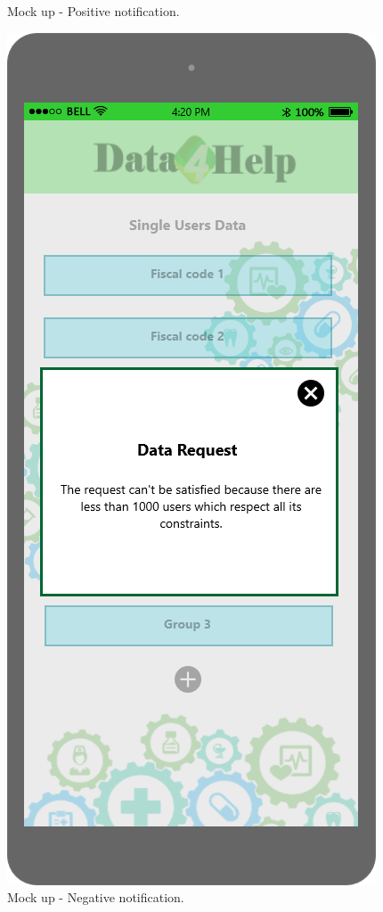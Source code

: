 \begin{figure}[h!]
\begin{minipage}[b]{0.25\textwidth}
    		\caption{Mock up - Positive notification.}
	\end{minipage}
	\hfill
	\begin{minipage}[b]{0.25\textwidth}
    		\includegraphics[width=\textwidth]{./pictures/group_refuse.png}
    		\caption{Mock up - Negative notification.}
	\end{minipage}
\end{figure}

